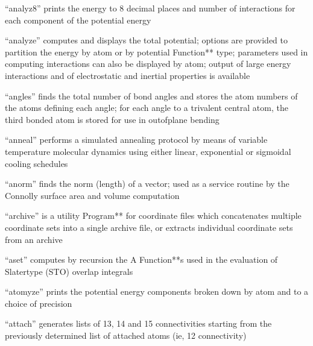 \documentclass[letterpaper,11pt,english]{sphinxmanual}
\begin{document}
“analyz8” prints the energy to 8 decimal places and number of interactions for each component of the potential energy


“analyze” computes and displays the total potential; options are provided to partition the energy by atom or by potential Function** type; parameters used in computing interactions can also be displayed by atom; output of large energy interactions and of electrostatic and inertial properties is available


“angles” finds the total number of bond angles and stores the atom numbers of the atoms defining each angle; for each angle to a trivalent central atom, the third bonded atom is stored for use in out\sphinxhyphen{}of\sphinxhyphen{}plane bending


“anneal” performs a simulated annealing protocol by means of variable temperature molecular dynamics using either linear, exponential or sigmoidal cooling schedules


“anorm” finds the norm (length) of a vector; used as a service routine by the Connolly surface area and volume computation


“archive” is a utility Program** for coordinate files which concatenates multiple coordinate sets into a single archive file, or extracts individual coordinate sets from an archive


“aset” computes by recursion the A Function**s used in the evaluation of Slater\sphinxhyphen{}type (STO) overlap integrals


“atomyze” prints the potential energy components broken down by atom and to a choice of precision


“attach” generates lists of 1\sphinxhyphen{}3, 1\sphinxhyphen{}4 and 1\sphinxhyphen{}5 connectivities starting from the previously determined list of attached atoms (ie, 1\sphinxhyphen{}2 connectivity)

\end{document}
